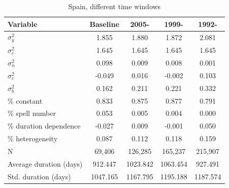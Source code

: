 \documentclass[12pt]{article}
\theoremstyle{definition}
\theoremstyle{remark}
\begin{document}
\begin{appendices}
\begin{table}[htbb!]\label{tab:results_spain_sample}
    \centering
    \caption{Spain, different time windows}
    \begin{tabular}{lcccc}
\toprule
Variable & Baseline & 2005- & 1999- & 1992- \\
\midrule
$\sigma^{2}_y$ & 1.855 & 1.880 & 1.872 & 2.081 \\
$\sigma^{2}_c$ & 1.645 & 1.645 & 1.645 & 1.645 \\
$\sigma^{2}_n$ & 0.098 & 0.009 & 0.008 & 0.001 \\
$\sigma^{2}_e$ & -0.049 & 0.016 & -0.002 & 0.103 \\
$\sigma^{2}_b$ & 0.162 & 0.211 & 0.221 & 0.332 \\
\midrule
\% constant & 0.833 & 0.875 & 0.877 & 0.791 \\
\% spell number & 0.053 & 0.005 & 0.004 & 0.000 \\
\% duration dependence & -0.027 & 0.009 & -0.001 & 0.050 \\
\% heterogeneity & 0.087 & 0.112 & 0.118 & 0.159 \\
\hline \hline
N & 69,406 & 126,285 & 165,237 & 215,907 \\
Average duration (days) & 912.447 & 1023.842 & 1063.454 & 927.491 \\
Std. duration (days) & 1047.165 & 1167.795 & 1195.188 & 1187.574 \\
\bottomrule
\end{tabular}

\end{table}



\end{appendices}
\end{document}
